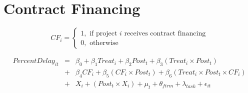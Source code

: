 \documentclass[
]{article}
\begin{document}
\hypertarget{contract-financing}{%
\section{Contract Financing}\label{contract-financing}}

\[ CF_i = \begin{cases} 1, \text{ if project } i \text{ receives contract financing}\\
0, \text{ otherwise} \end{cases}\]

\[ \begin{aligned}
PercentDelay_{it} &=& \beta_0+\beta_1 Treat_i + \beta_2 Post_t + \beta_3 (Treat_i \times Post_t) \\
&+&\beta_4 CF_i + \beta_5 (CF_i \times Post_t) + \beta_6 (Treat_i \times Post_t \times CF_i) \\ 
&+&X_i + (Post_t \times X_i) + \mu_t + \theta_{firm} + \lambda_{task}+ \epsilon_{it}
\end{aligned}\]
\end{document}
